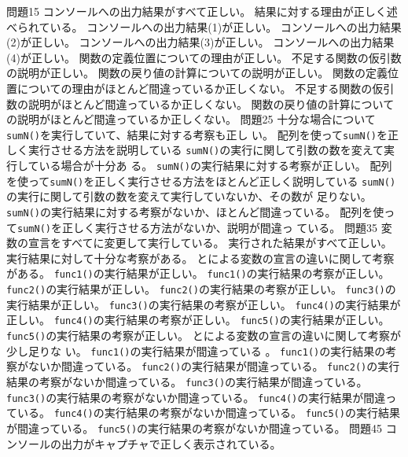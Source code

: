 {{問題1}{5}{
  {コンソールへの出力結果がすべて正しい。}
	{結果に対する理由が正しく述べられている。}
	}
	{
  {コンソールへの出力結果(1)が正しい。}
  {コンソールへの出力結果(2)が正しい。}
  {コンソールへの出力結果(3)が正しい。}
  {コンソールへの出力結果(4)が正しい。}
	{関数の定義位置についての理由が正しい。}
	{不足する関数の仮引数の説明が正しい。}
	{関数の戻り値の計算についての説明が正しい。}
	}
	{
	{関数の定義位置についての理由がほとんど間違っているか正しくない。}
	{不足する関数の仮引数の説明がほとんど間違っているか正しくない。}
	{関数の戻り値の計算についての説明がほとんど間違っているか正しくない。}
	}
{問題2}{5}{
  {十分な場合について\texttt{sumN()}を実行していて、結果に対する考察も正し
	い。}
	{配列を使って\texttt{sumN()}を正しく実行させる方法を説明している}
	}
	{
  {\texttt{sumN()}の実行に関して引数の数を変えて実行している場合が十分あ
	る。}
  {\texttt{sumN()}の実行結果に対する考察が正しい。}
	{配列を使って\texttt{sumN()}を正しく実行させる方法をほとんど正しく説明している}
	}
	{
  {\texttt{sumN()}の実行に関して引数の数を変えて実行していないか、その数が
	足りない。}
  {\texttt{sumN()}の実行結果に対する考察がないか、ほとんど間違っている。}
	{配列を使って\texttt{sumN()}を正しく実行させる方法がないか、説明が間違っ
  ている。}
	}
{問題3}{5}{
  {変数の宣言をすべてに変更して実行している。}
  {実行された結果がすべて正しい。}
  {実行結果に対して十分な考察がある。}
  {とによる変数の宣言の違いに関して考察がある。}
	}
	{
	{\texttt{func1()}の実行結果が正しい。}
	{\texttt{func1()}の実行結果の考察が正しい。}
	{\texttt{func2()}の実行結果が正しい。}
	{\texttt{func2()}の実行結果の考察が正しい。}
	{\texttt{func3()}の実行結果が正しい。}
	{\texttt{func3()}の実行結果の考察が正しい。}
	{\texttt{func4()}の実行結果が正しい。}
	{\texttt{func4()}の実行結果の考察が正しい。}
	{\texttt{func5()}の実行結果が正しい。}
	{\texttt{func5()}の実行結果の考察が正しい。}
  {とによる変数の宣言の違いに関して考察が少し足りな
  い。}
	}
	{
	{\texttt{func1()}の実行結果が間違っている%
  。}
	{\texttt{func1()}の実行結果の考察がないか間違っている。}
	{\texttt{func2()}の実行結果が間違っている。}
	{\texttt{func2()}の実行結果の考察がないか間違っている。}
	{\texttt{func3()}の実行結果が間違っている。}
	{\texttt{func3()}の実行結果の考察がないか間違っている。}
	{\texttt{func4()}の実行結果が間違っている。}
	{\texttt{func4()}の実行結果の考察がないか間違っている。}
	{\texttt{func5()}の実行結果が間違っている。}
	{\texttt{func5()}の実行結果の考察がないか間違っている。}
	}
{問題4}{5}{
  {コンソールの出力がキャプチャで正しく表示されている。}
}}
